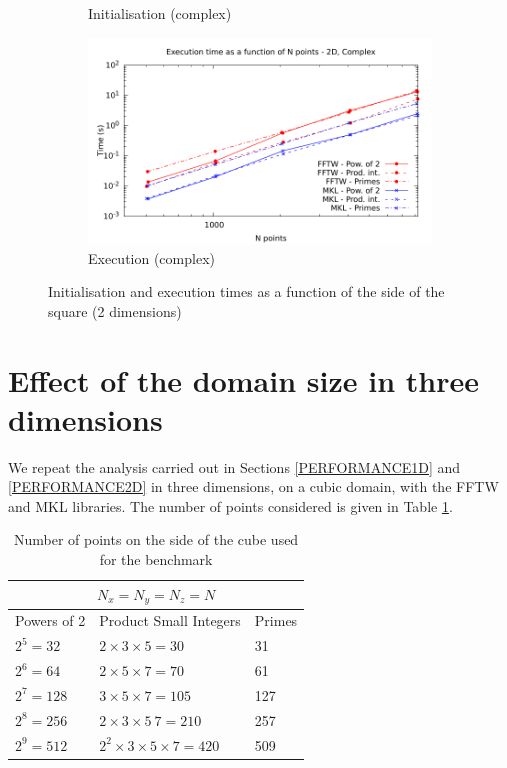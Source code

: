 \documentclass[12pt, a4paper]{article} \setlength{\textheight}{24cm}
\begin{document}
\begin{figure}[H]
\begin{subfigure}{.5\textwidth}
    \caption{Initialisation (complex)}
    \label{2DCI}
  \end{subfigure}%
  \begin{subfigure}{.5\textwidth}
    \centering
    \includegraphics[width=.9\linewidth]{graphs/2d-exec-c.pdf}
    \caption{Execution (complex)}
    \label{2DC}
  \end{subfigure}
  \caption{Initialisation and execution times as a function of the
    side of the square (2 dimensions)}
  \label{2D}
\end{figure}

\section{Effect of the domain size in three  dimensions}\label{PERFORMANCE3D}

We repeat the analysis carried out in Sections \ref{PERFORMANCE1D} and
\ref{PERFORMANCE2D} in three dimensions, on a cubic domain, with the
FFTW and MKL libraries. The number of points considered is given in
Table \ref{SIZES3D}.

\begin{table}[H]
  \centering
  \begin{tabular}{|l|l|l|}
    \hline
    \multicolumn{3}{|c|}{$N_x=N_y=N_z=N$}\\
    \hline
    \hline
    Powers of 2 & Product Small Integers & Primes\\ \hline
    $2^5=32$ & $2\times 3\times 5=30$	& 31\\ \hline
    $2^6=64$ & $2\times 5\times 7=70$	& 61\\ \hline
    $2^7=128$ & $3\times 5\times 7=105$ & 127\\ \hline
    $2^8=256$ & $2\times 3\times 5\ 7=210$ & 257\\ \hline
    $2^9=512$ & $2^2\times 3\times 5\times 7=420$ & 509\\ \hline
  \end{tabular}
  \caption{Number of points on the side of the cube used for the benchmark}\label{SIZES3D}
\end{table}
\end{document}
